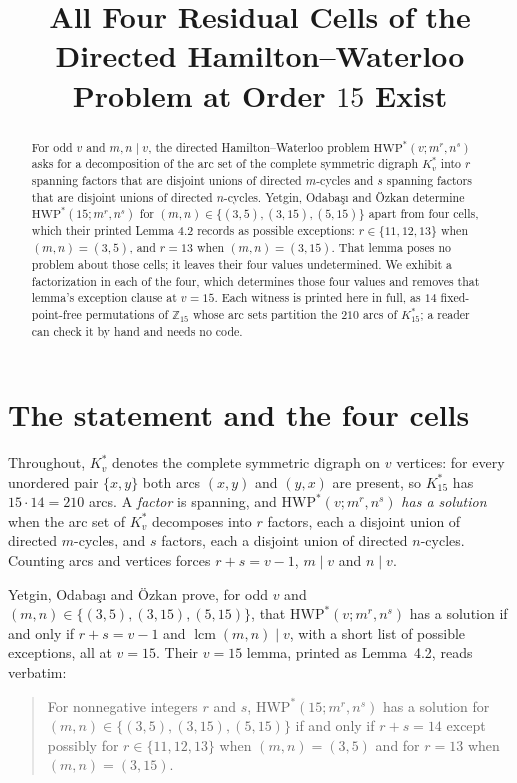 \documentclass[11pt]{amsart}
\title[The four residual cells at order $15$]
{All Four Residual Cells of the Directed Hamilton--Waterloo Problem at Order $15$ Exist}
\date{}
\theoremstyle{remark}
\DeclareMathOperator{\lcmop}{lcm}
\newcommand{\Kstar}{K^{*}}
\newcommand{\HWP}{\mathrm{HWP}^{*}}
\newcommand{\Zfif}{\mathbb{Z}_{15}}
\begin{document}
\begin{abstract}
For odd $v$ and $m,n \mid v$, the directed Hamilton--Waterloo problem
$\HWP(v; m^{r}, n^{s})$ asks for a decomposition of the arc set of the complete
symmetric digraph $\Kstar_{v}$ into $r$ spanning factors that are disjoint
unions of directed $m$-cycles and $s$ spanning factors that are disjoint unions
of directed $n$-cycles. Yetgin, Odaba\c{s}\i{} and \"Ozkan determine
$\HWP(15; m^{r}, n^{s})$ for $(m,n)\in\{(3,5),(3,15),(5,15)\}$ apart from four
cells, which their printed Lemma 4.2 records as possible exceptions:
$r\in\{11,12,13\}$ when $(m,n)=(3,5)$, and $r=13$ when $(m,n)=(3,15)$. That
lemma poses no problem about those cells; it leaves their four values
undetermined. We exhibit a factorization in each of the four, which determines
those four values and removes that lemma's exception clause at $v=15$.
Each witness is printed here in full, as $14$ fixed-point-free permutations of
$\Zfif$ whose arc sets partition the $210$ arcs of $\Kstar_{15}$; a reader can
check it by hand and needs no code.
\end{abstract}

\maketitle

\sloppy

\section{The statement and the four cells}

Throughout, $\Kstar_{v}$ denotes the complete symmetric digraph on $v$ vertices:
for every unordered pair $\{x,y\}$ both arcs $(x,y)$ and $(y,x)$ are present, so
$\Kstar_{15}$ has $15 \cdot 14 = 210$ arcs. A \emph{factor} is spanning, and
$\HWP(v; m^{r}, n^{s})$ \emph{has a solution} when the arc set of $\Kstar_{v}$
decomposes into $r$ factors, each a disjoint union of directed $m$-cycles, and
$s$ factors, each a disjoint union of directed $n$-cycles. Counting arcs and
vertices forces $r+s=v-1$, $m \mid v$ and $n \mid v$.

Yetgin, Odaba\c{s}\i{} and \"Ozkan \cite{YOO} prove, for odd $v$ and
$(m,n) \in \{(3,5),(3,15),(5,15)\}$, that $\HWP(v; m^{r}, n^{s})$ has a solution
if and only if $r+s=v-1$ and $\lcmop(m,n) \mid v$, with a short list of possible
exceptions, all at $v=15$. Their $v=15$ lemma, printed as Lemma~4.2, reads
verbatim:

\begin{quote}
For nonnegative integers $r$ and $s$, $\HWP(15; m^{r}, n^{s})$ has a solution for
$(m,n)\in \{(3,5),(3,15),(5,15)\}$ if and only if $r+s=14$ except possibly for
$r\in \{11,12,13\}$ when $(m, n)=(3, 5)$ and for $r=13$ when $(m, n)=(3, 15)$.
\end{quote}
\end{document}
